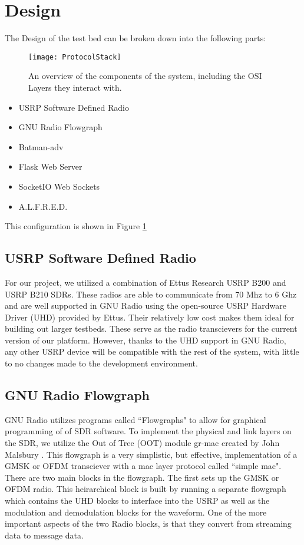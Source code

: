 \section{Design}

The Design of the test bed can be broken down into the following parts:

\begin{figure}
	\centering
	\texttt{[image: ProtocolStack]}
	\caption{An overview of the components of the system, including the OSI Layers they interact with. \cite{0003} \cite{0008} \cite{0015} \cite{0012} \cite{0011}}
	\label{fig:ProtocolStack}
\end{figure}

\begin{itemize}
	\item USRP Software Defined Radio
	\item GNU Radio Flowgraph
	\item Batman-adv
	\item Flask Web Server
	\item SocketIO Web Sockets
	\item A.L.F.R.E.D. 
\end{itemize}

This configuration is shown in Figure \ref{fig:ProtocolStack}

\subsection{USRP Software Defined Radio}

For our project, we utilized a combination of Ettus Research USRP B200 and USRP B210 SDRs. These radios are able to communicate from 70 Mhz to 6 Ghz and are well supported in GNU Radio using the open-source USRP Hardware Driver (UHD) provided by Ettus. Their relatively low cost makes them ideal for building out larger testbeds. These serve as the radio transcievers for the current version of our platform. However, thanks to the UHD support in GNU Radio, any other USRP device will be compatible with the rest of the system, with little to no changes made to the development environment. 

\subsection{GNU Radio Flowgraph}

GNU Radio utilizes programs called ``Flowgraphs" to allow for graphical programming of of SDR software. To implement the physical and link layers on the SDR, we utilize the Out of Tree (OOT) module gr-mac created by John Malsbury \cite{0015}. This flowgraph is a very simplistic, but effective, implementation of a GMSK or OFDM transciever with a mac layer protocol called ``simple mac". There are two main blocks in the flowgraph. The first sets up the GMSK or OFDM radio. This heirarchical block is built by running a separate flowgraph which contains the UHD blocks to interface into the USRP as well as the modulation and demodulation blocks for the waveform. One of the more important aspects of the two Radio blocks, is that they convert from streaming data to message data. 

